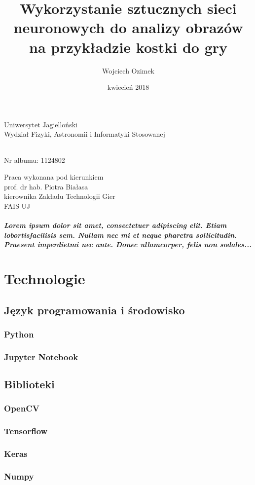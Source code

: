 \documentclass[a4paper,oneside,12pt]{report}
\author{Wojciech Ozimek}
\title{Wykorzystanie sztucznych sieci neuronowych do analizy obrazów na przykładzie kostki do gry}
\date{kwiecień 2018}
\makeatletter
\renewcommand{\maketitle}{\begin{titlepage}
	
	\vspace*{ \stretch{1} }
	\begin{center} \LARGE
	Uniwersytet Jagielloński \\
  	Wydział Fizyki, Astronomii i Informatyki Stosowanej
	\end{center}
	
	\vspace{ \stretch{1} }
	\begin{center} \Huge 
		\textsc {\@title}
	\end{center}
			
	\vspace{ \stretch{1} }
	\begin{center}
		\large \@author \\
		\vspace{3mm}
		\normalsize Nr albumu: 1124802
	\end{center}
	
	\vspace{ \stretch{1.5} }
	\begin{flushright}
	\begin{minipage}{8cm}
	\begin{center} \large
	Praca wykonana pod kierunkiem \\
	prof. dr hab. Piotra Białasa \\
	kierownika Zakładu Technologii Gier \\
	FAIS UJ
	\end{center}
	\end{minipage}
	\end{flushright}
	\vspace{ \stretch{1} }
	\begin{center}
	\@date
	\end{center}
\end{titlepage}
}
\makeatother
\begin{document}
\maketitle{}

\tableofcontents
\newpage




\paragraph {Lorem  ipsum  dolor  sit  amet,  consectetuer  adipiscing  
elit.   Etiam  lobortisfacilisis sem.  Nullam nec mi et 
neque pharetra sollicitudin.  Praesent imperdietmi nec ante. 
Donec ullamcorper, felis non sodales...}


\chapter {Technologie}

\section {Język programowania i środowisko}

\subsection {Python}

\subsection {Jupyter Notebook}

\section {Biblioteki}

\subsection {OpenCV}

\subsection {Tensorflow}

\subsection {Keras}

\subsection {Numpy}
\end{document}
